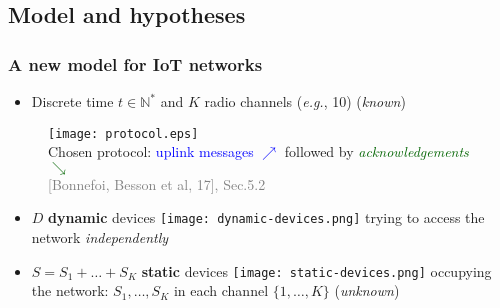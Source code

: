\subsection{Model and hypotheses}

\subsubsection{A new model for IoT networks}

\begin{frameO}

    \begin{itemize}
        \item
              Discrete time \(t\in\mathbb{N}^*\) and \(K\) radio channels (\emph{e.g.}, 10)
              \hfill{} (\emph{known})
    \end{itemize}

    \begin{figure}[h!]
        \centering
        \texttt{[image: protocol.eps]}\\
        
        {\small Chosen protocol: \textcolor{blue}{uplink messages {\large $\nearrow$}} followed by \textcolor{darkgreen}{\emph{acknowledgements} {\large $\searrow$}}}\\
        \hfill{} {\tiny \textcolor{gray}{[Bonnefoi, Besson et al, 17], Sec.5.2}}
    \end{figure}

    \begin{itemize}
        \item
              \(D\) \textbf{dynamic} devices \texttt{[image: dynamic-devices.png]} trying to access the network \emph{independently}
        \item
              \(S=S_1+\dots+S_{K}\) \textbf{static} devices \texttt{[image: static-devices.png]} occupying the network:
              \newline
              \(S_1,\dots,S_{K}\) in each channel \(\{1,\dots,K\}\) \hfill{} (\emph{unknown})
    \end{itemize}

\end{frameO}


\begin{frameO}

    \begin{center}
    \end{center}

\end{frameO}


